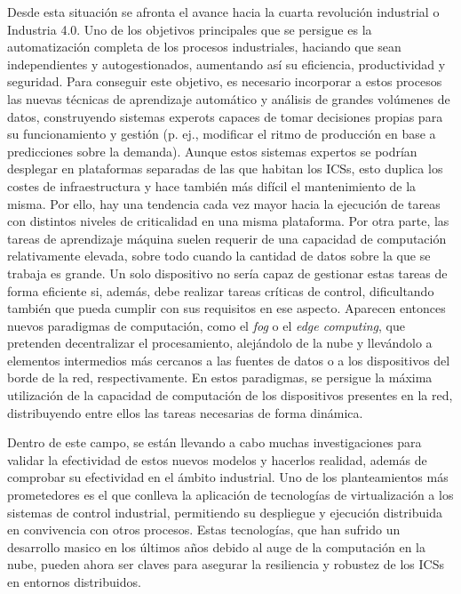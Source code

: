 Desde esta situación se afronta el avance hacia la cuarta revolución industrial
o Industria 4.0. Uno de los objetivos principales que se persigue es la
automatización completa de los procesos industriales, haciando que sean
independientes y autogestionados, aumentando así su eficiencia, productividad y
seguridad. Para conseguir este objetivo, es necesario incorporar a estos
procesos las nuevas técnicas de aprendizaje automático y análisis de grandes
volúmenes de datos, construyendo sistemas experots capaces de tomar decisiones
propias para su funcionamiento y gestión (p. ej., modificar el ritmo de
producción en base a predicciones sobre la demanda). Aunque estos sistemas
expertos se podrían desplegar en plataformas separadas de las que habitan los
ICSs, esto duplica los costes de infraestructura y hace también más difícil el
mantenimiento de la misma. Por ello, hay una tendencia cada vez mayor hacia la
ejecución de tareas con distintos niveles de criticalidad en una misma
plataforma. Por otra parte, las tareas de aprendizaje máquina suelen requerir de
una capacidad de computación relativamente elevada, sobre todo cuando la
cantidad de datos sobre la que se trabaja es grande. Un solo dispositivo no
sería capaz de gestionar estas tareas de forma eficiente si, además, debe
realizar tareas críticas de control, dificultando también que pueda cumplir con
sus requisitos en ese aspecto. Aparecen entonces nuevos paradigmas de
computación, como el \textit{fog} o el \textit{edge computing}, que pretenden
decentralizar el procesamiento, alejándolo de la nube y llevándolo a elementos
intermedios más cercanos a las fuentes de datos o a los dispositivos del borde
de la red, respectivamente. En estos paradigmas, se persigue la máxima
utilización de la capacidad de computación de los dispositivos presentes en la
red, distribuyendo entre ellos las tareas necesarias de forma dinámica.

Dentro de este campo, se están llevando a cabo muchas investigaciones para
validar la efectividad de estos nuevos modelos y hacerlos realidad, además de
comprobar su efectividad en el ámbito industrial. Uno de los planteamientos más
prometedores es el que conlleva la aplicación de tecnologías de virtualización a
los sistemas de control industrial, permitiendo su despliegue y ejecución
distribuida en convivencia con otros procesos. Estas tecnologías, que han
sufrido un desarrollo masico en los últimos años debido al auge de la
computación en la nube, pueden ahora ser claves para asegurar la resiliencia y
robustez de los ICSs en entornos distribuidos.

